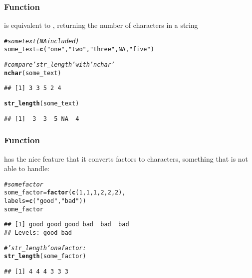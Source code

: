 \documentclass[12pt]{beamer}\usepackage[]{graphicx}\usepackage[]{color}
\makeatletter
\newcommand{\hlnum}[1]{\textcolor[rgb]{0.686,0.059,0.569}{#1}}%
\newcommand{\hlstr}[1]{\textcolor[rgb]{0.192,0.494,0.8}{#1}}%
\newcommand{\hlcom}[1]{\textcolor[rgb]{0.678,0.584,0.686}{\textit{#1}}}%
\newcommand{\hlstd}[1]{\textcolor[rgb]{0.345,0.345,0.345}{#1}}%
\newcommand{\hlkwb}[1]{\textcolor[rgb]{0.69,0.353,0.396}{#1}}%
\newcommand{\hlkwc}[1]{\textcolor[rgb]{0.333,0.667,0.333}{#1}}%
\newcommand{\hlkwd}[1]{\textcolor[rgb]{0.737,0.353,0.396}{\textbf{#1}}}%
\newenvironment{kframe}{%
 \def\at@end@of@kframe{}%
 \ifinner\ifhmode%
  \def\at@end@of@kframe{\end{minipage}}%
  \begin{minipage}{\columnwidth}%
 \fi\fi%
 \def\FrameCommand##1{\hskip\@totalleftmargin \hskip-\fboxsep
 \colorbox{shadecolor}{##1}\hskip-\fboxsep
     \hskip-\linewidth \hskip-\@totalleftmargin \hskip\columnwidth}%
 \MakeFramed {\advance\hsize-\width
   \@totalleftmargin\z@ \linewidth\hsize
   \@setminipage}}%
 {\par\unskip\endMakeFramed%
 \at@end@of@kframe}
\newenvironment{knitrout}{}{} %
\makeatother
\begin{document}
\begin{frame}[fragile]
\frametitle{Function }

 is equivalent to , returning the number of characters in a string
\begin{knitrout}\footnotesize
{}\color{fgcolor}\begin{kframe}
\begin{alltt}
\hlcom{# some text (NA included)}
\hlstd{some_text} \hlkwb{=} \hlkwd{c}\hlstd{(}\hlstr{"one"}\hlstd{,} \hlstr{"two"}\hlstd{,} \hlstr{"three"}\hlstd{,} \hlnum{NA}\hlstd{,} \hlstr{"five"}\hlstd{)}

\hlcom{# compare 'str_length' with 'nchar'}
\hlkwd{nchar}\hlstd{(some_text)}
\end{alltt}
\begin{verbatim}
## [1] 3 3 5 2 4
\end{verbatim}
\begin{alltt}
\hlkwd{str_length}\hlstd{(some_text)}
\end{alltt}
\begin{verbatim}
## [1]  3  3  5 NA  4
\end{verbatim}
\end{kframe}
\end{knitrout}

\end{frame}


\begin{frame}[fragile]
\frametitle{Function }

 has the nice feature that it converts factors to characters, something that  is not able to handle:
\begin{knitrout}\footnotesize
{}\color{fgcolor}\begin{kframe}
\begin{alltt}
\hlcom{# some factor}
\hlstd{some_factor} \hlkwb{=} \hlkwd{factor}\hlstd{(}\hlkwd{c}\hlstd{(}\hlnum{1}\hlstd{,} \hlnum{1}\hlstd{,} \hlnum{1}\hlstd{,} \hlnum{2}\hlstd{,} \hlnum{2}\hlstd{,} \hlnum{2}\hlstd{),}
                     \hlkwc{labels} \hlstd{=} \hlkwd{c}\hlstd{(}\hlstr{"good"}\hlstd{,} \hlstr{"bad"}\hlstd{))}
\hlstd{some_factor}
\end{alltt}
\begin{verbatim}
## [1] good good good bad  bad  bad 
## Levels: good bad
\end{verbatim}
\begin{alltt}
\hlcom{# 'str_length' on a factor:}
\hlkwd{str_length}\hlstd{(some_factor)}
\end{alltt}
\begin{verbatim}
## [1] 4 4 4 3 3 3
\end{verbatim}
\end{kframe}
\end{knitrout}

\end{frame}
\end{document}
